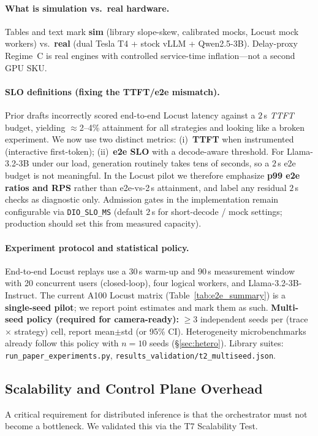 \documentclass[10pt,twocolumn,letterpaper]{article}
\begin{document}
\paragraph{What is simulation vs.\ real hardware.}
Tables and text mark \textbf{sim} (library slope-skew, calibrated mocks, Locust mock workers) vs.\ \textbf{real} (dual Tesla T4 + stock vLLM + Qwen2.5-3B). Delay-proxy Regime~C is real engines with controlled service-time inflation---not a second GPU SKU.

\paragraph{SLO definitions (fixing the TTFT/e2e mismatch).}
Prior drafts incorrectly scored end-to-end Locust latency against a $2$\,s \emph{TTFT} budget, yielding $\approx$2--4\% attainment for all strategies and looking like a broken experiment. We now use two distinct metrics: (i)~\textbf{TTFT} when instrumented (interactive first-token); (ii)~\textbf{e2e SLO} with a decode-aware threshold. For Llama-3.2-3B under our load, generation routinely takes tens of seconds, so a $2$\,s e2e budget is not meaningful. In the Locust pilot we therefore emphasize \textbf{p99 e2e ratios and RPS} rather than e2e-vs-2\,s attainment, and label any residual $2$\,s checks as diagnostic only. Admission gates in the implementation remain configurable via \texttt{DIO\_SLO\_MS} (default $2$\,s for short-decode / mock settings; production should set this from measured capacity).

\paragraph{Experiment protocol and statistical policy.}
End-to-end Locust replays use a 30\,s warm-up and 90\,s measurement window with 20 concurrent users (closed-loop), four logical workers, and Llama-3.2-3B-Instruct. The current A100 Locust matrix (Table~\ref{tab:e2e_summary}) is a \textbf{single-seed pilot}; we report point estimates and mark them as such. \textbf{Multi-seed policy (required for camera-ready):} $\ge$3 independent seeds per (trace $\times$ strategy) cell, report mean$\pm$std (or 95\% CI). Heterogeneity microbenchmarks already follow this policy with $n{=}10$ seeds (\S\ref{sec:hetero}). Library suites: \texttt{run\_paper\_experiments.py}, \texttt{results\_validation/t2\_multiseed.json}.
\subsection{Scalability and Control Plane Overhead}
A critical requirement for distributed inference is that the orchestrator must not become a bottleneck. We validated this via the T7 Scalability Test.
\end{document}
